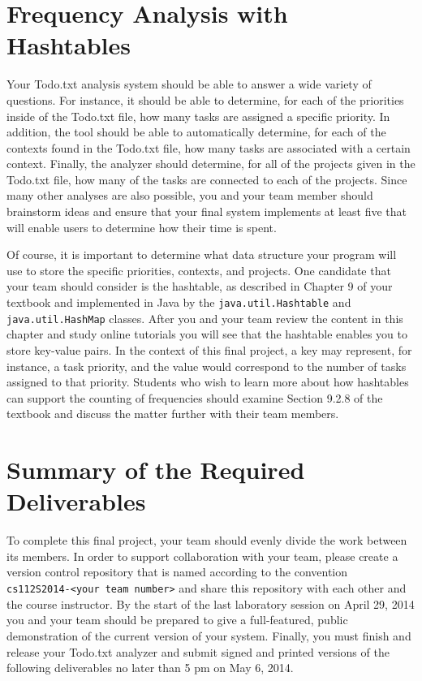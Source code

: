 \section*{Frequency Analysis with Hashtables}

  Your Todo.txt analysis system should be able to answer a wide variety of questions. For instance, it should be able to
  determine, for each of the priorities inside of the Todo.txt file, how many tasks are assigned a specific priority.
  In addition, the tool should be able to automatically determine, for each of the contexts found in the Todo.txt file,
  how many tasks are associated with a certain context. Finally, the analyzer should determine, for all of the projects
  given in the Todo.txt file, how many of the tasks are connected to each of the projects. Since many other analyses are
  also possible, you and your team member should brainstorm ideas and ensure that your final system implements at least
  five that will enable users to determine how their time is spent.

  Of course, it is important to determine what data structure your program will use to store the specific priorities,
  contexts, and projects.  One candidate that your team should consider is the hashtable, as described in Chapter 9 of
  your textbook and implemented in Java by the {\tt java.util.Hashtable} and {\tt java.util.HashMap} classes. After you
  and your team review the content in this chapter and study online tutorials you will see that the hashtable enables
  you to store key-value pairs.  In the context of this final project, a key may represent, for instance, a task
  priority, and the value would correspond to the number of tasks assigned to that priority. Students who wish to
  learn more about how hashtables can support the counting of frequencies should examine Section 9.2.8 of the textbook
  and discuss the matter further with their team members.


\section*{Summary of the Required Deliverables}

 To complete this final project, your team should evenly divide the work between its members.  In order to support
 collaboration with your team, please create a version control repository that is named according to the convention {\tt
 cs112S2014-<your team number>} and share this repository with each other and the course instructor. By the start of the
 last laboratory session on April 29, 2014 you and your team should be prepared to give a full-featured, public
 demonstration of the current version of your system. Finally, you must finish and release your Todo.txt analyzer and
 submit signed and printed versions of the following deliverables no later than 5 pm on May 6, 2014.

